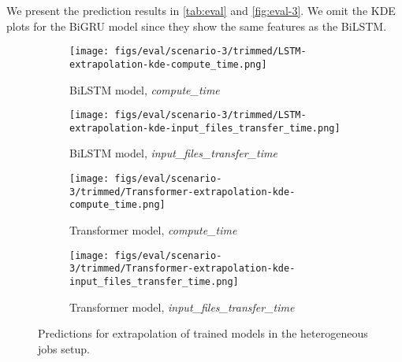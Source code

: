 We present the prediction results %
in \autoref{tab:eval} and \autoref{fig:eval-3}.
We omit the KDE plots for the BiGRU model since they show the same features as the BiLSTM.
%
\begin{figure}%
    \begin{subfigure}{0.49\linewidth}%
    \centering%
    \texttt{[image: figs/eval/scenario-3/trimmed/LSTM-extrapolation-kde-compute\_time.png]}%
    \vspace{-0.5em}%
    \caption{BiLSTM model, \textit{compute\_time}}%
    \label{fig:eval-3-LSTM-extrapolation-compute}%
    \end{subfigure}%
    \hfill%
    \begin{subfigure}{0.49\linewidth}%
    \centering%
    \texttt{[image: figs/eval/scenario-3/trimmed/LSTM-extrapolation-kde-input\_files\_transfer\_time.png]}%
    \vspace{-0.5em}
    \caption{BiLSTM model, \textit{input\_files\_transfer\_time}}%
    \label{fig:eval-3-LSTM-extrapolation-input}%
    \end{subfigure}%
    \label{fig:eval-3-lstm}%
    \hfill
    \begin{subfigure}{0.49\linewidth}%
    \centering%
    \texttt{[image: figs/eval/scenario-3/trimmed/Transformer-extrapolation-kde-compute\_time.png]}%
    \vspace{-0.5em}%
    \caption{Transformer model, \textit{compute\_time}}%
    \label{fig:eval-3-transformer-extrapolation-compute}  %
    \end{subfigure}%
    \hfill%
    \begin{subfigure}{0.49\linewidth}%
    \centering%
    \texttt{[image: figs/eval/scenario-3/trimmed/Transformer-extrapolation-kde-input\_files\_transfer\_time.png]}%
    \vspace{-0.5em}%
    \caption{Transformer model, \textit{input\_files\_transfer\_time}}%
    \label{fig:eval-3-transformer-extrapolation-input}%
    \end{subfigure}%
    \vspace{-1em}
    \caption{Predictions for extrapolation of trained models in the heterogeneous jobs setup.}%
    \label{fig:eval-3}%
\end{figure}%
